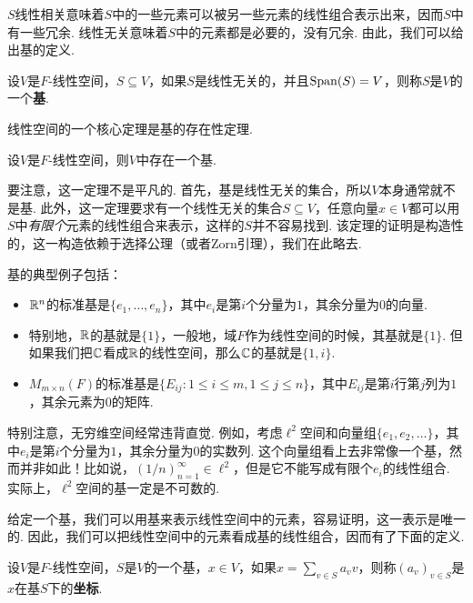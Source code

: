 $S$线性相关意味着$S$中的一些元素可以被另一些元素的线性组合表示出来，因而$S$中有一些冗余. 线性无关意味着$S$中的元素都是必要的，没有冗余. 由此，我们可以给出基的定义. 

\begin{definition}[基]
设$V$是$F$-线性空间，$S\subseteq V$，如果$S$是线性无关的，并且$\operatorname*{Span}(S)=V$，则称$S$是$V$的一个\textbf{基}. 
\end{definition}

线性空间的一个核心定理是基的存在性定理. 

\begin{theorem}[基的存在性定理]\label{theorem:existence-of-basis}
设$V$是$F$-线性空间，则$V$中存在一个基. 
\end{theorem}

要注意，这一定理不是平凡的. 首先，基是线性无关的集合，所以$V$本身通常就不是基. 此外，这一定理要求有一个线性无关的集合$S\subseteq V$，任意向量$x\in V$都可以用$S$中\textit{有限个}元素的线性组合来表示，这样的$S$并不容易找到. 该定理的证明是构造性的，这一构造依赖于选择公理（或者Zorn引理），我们在此略去. 

基的典型例子包括：
\begin{itemize}
    \item $\mathbb{R}^n$的标准基是$\{e_1,\dots,e_n\}$，其中$e_i$是第$i$个分量为$1$，其余分量为$0$的向量. 
    \item 特别地，$\mathbb{R}$的基就是$\{1\}$，一般地，域$F$作为线性空间的时候，其基就是$\{1\}$. 但如果我们把$\mathbb{C}$看成$\mathbb{R}$的线性空间，那么$\mathbb{C}$的基就是$\{1,i\}$.
    \item $M_{m\times n}(F)$的标准基是$\{E_{ij}:1\leq i\leq m,1\leq j\leq n\}$，其中$E_{ij}$是第$i$行第$j$列为$1$，其余元素为$0$的矩阵. 
\end{itemize}

特别注意，无穷维空间经常违背直觉. 例如，考虑$\ell^2$空间和向量组$\{e_1,e_2,\dots\}$，其中$e_i$是第$i$个分量为$1$，其余分量为$0$的实数列. 这个向量组看上去非常像一个基，然而并非如此！比如说，$(1/n)_{n=1}^\infty\in\ell^2$，但是它不能写成有限个$e_i$的线性组合. 实际上，$\ell^2$空间的基一定是不可数的. 

给定一个基，我们可以用基来表示线性空间中的元素，容易证明，这一表示是唯一的. 因此，我们可以把线性空间中的元素看成基的线性组合，因而有了下面的定义. 

\begin{definition}[坐标]
设$V$是$F$-线性空间，$S$是$V$的一个基，$x\in V$，如果$x=\sum_{v\in S} a_v v$，则称$(a_v)_{v\in S}$是$x$在基$S$下的\textbf{坐标}. 
\end{definition}

